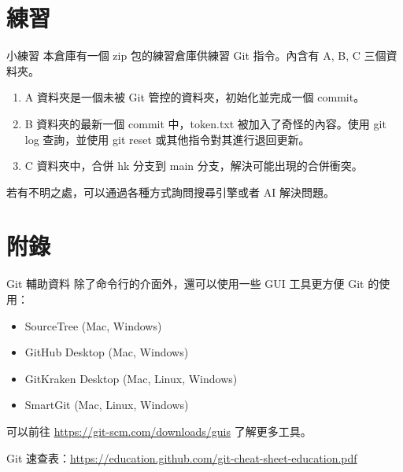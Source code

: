 \documentclass[xetex, unicode, 10pt, aspectratio=169]{beamer}
\begin{document}
\section{練習}
\begin{frame}{小練習}
    本倉庫有一個 zip 包的練習倉庫供練習 Git 指令。內含有 A, B, C 三個資料夾。
    \begin{enumerate}
        \item A 資料夾是一個未被 Git 管控的資料夾，初始化並完成一個 commit。
        \item B 資料夾的最新一個 commit 中，token.txt 被加入了奇怪的內容。使用 git log 查詢，並使用 git reset 或其他指令對其進行退回更新。
        \item C 資料夾中，合併 hk 分支到 main 分支，解決可能出現的合併衝突。
    \end{enumerate}

    若有不明之處，可以通過各種方式詢問搜尋引擎或者 AI 解決問題。
\end{frame}

\section{附錄}

\begin{frame}{Git 輔助資料}
    除了命令行的介面外，還可以使用一些 GUI 工具更方便 Git 的使用：
    \begin{itemize}
        \item SourceTree (Mac, Windows)
        \item GitHub Desktop (Mac, Windows)
        \item GitKraken Desktop (Mac, Linux, Windows)
        \item SmartGit (Mac, Linux, Windows)
    \end{itemize}

    可以前往
    \underline{\href{https://git-scm.com/downloads/guis}{https://git-scm.com/downloads/guis}}
    了解更多工具。

    Git
    速查表：\underline{\href{https://education.github.com/git-cheat-sheet-education.pdf}{https://education.github.com/git-cheat-sheet-education.pdf}}
\end{frame}
\end{document}
